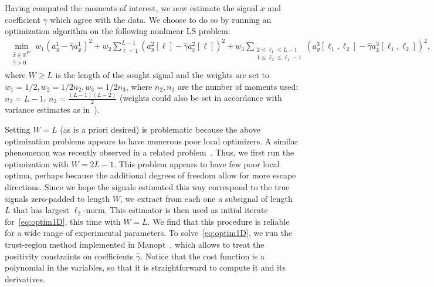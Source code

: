\documentclass[12pt]{article}
\newcommand{\1}{\mathbf{1}}
\theoremstyle{plain}
\theoremstyle{definition}
\theoremstyle{remark}
\theoremstyle{plain}
\theoremstyle{remark}
\theoremstyle{plain}
\theoremstyle{plain}
\begin{document}
Having computed the moments of interest, we now estimate the signal $x$ and coefficient $\gamma$ which agree with the data. We choose to do so by running an optimization algorithm on the following nonlinear LS problem:
\begin{align} 
\min_{\substack{\hat x\in \mathbb{R}^{W} \\ \hat \gamma > 0}} w_1 \left( a_y^1 - \hat \gamma a_{\hat x}^1 \right)^2  + w_2 \sum_{\ell = 1}^{L-1} \left( a_y^2[\ell] - \hat \gamma a_{\hat x}^2[\ell] \right)^2  + w_3 \sum_{\substack{2\leq\ell_1\leq L-1 \\ 1 \leq \ell_2 \leq \ell_1-1}} \left( a_y^3[\ell_1, \ell_2] -  \hat \gamma a_{\hat x}^3[\ell_1,\ell_2] \right)^2, 
\label{eq:optim1D}
\end{align}
where $W \geq L$ is the length of the sought signal and the weights are set to $w_1 = 1/2, w_2 = 1/2n_2, w_3 = 1/2n_3$, where $n_2, n_3$ are the number of moments used: $n_2 = L-1$, $n_3 = \frac{(L-1)(L-2)}{2}$ (weights could also be set in accordance with variance estimates as in~\cite{boumal2017heterogeneous}).

Setting $W = L$ (as is a priori desired) is problematic because the above optimization problems appears to have numerous poor local optimizers. A similar phenomenon was recently observed in a related problem~\cite{zhang2018structured}.
Thus, we first run the optimization with $W = 2L-1$. This problem appears to have few poor local optima, perhaps because the additional degrees of freedom allow for more escape directions. Since we hope the signals estimated this way correspond to the true signals zero-padded to length $W$, we extract from each one a subsignal of length $L$ that has largest $\ell_2$-norm. This estimator is then used as initial iterate for~\eqref{eq:optim1D}, this time with $W = L$. We find that this procedure is reliable for a wide range of experimental parameters. To solve~\eqref{eq:optim1D}, we run the trust-region method implemented in Manopt~\cite{manopt}, which allows to treat the positivity constraints on coefficients $\hat \gamma$. Notice that the cost function is a polynomial in the variables, so that it is straightforward to compute it and its derivatives.
\end{document}

